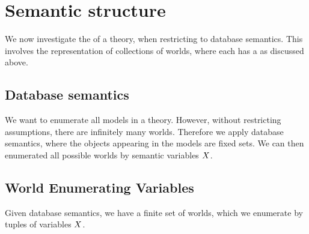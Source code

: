 \section{Semantic structure}

We now investigate the \semanticStructure{} of a \firstOrderLogic{} theory, when restricting to database semantics.
This involves the representation of collections of worlds, where each has a \substitutionStructure{} as discussed above.

\subsection{Database semantics}

We want to enumerate all models in a \firstOrderLogic{} theory.
However, without restricting assumptions, there are infinitely many worlds.
Therefore we apply database semantics, where the objects appearing in the models are fixed sets.
We can then enumerated all possible worlds by semantic variables $X$.

\subsection{World Enumerating Variables}

Given database semantics, we have a finite set of worlds, which we enumerate by tuples of variables $X$.

